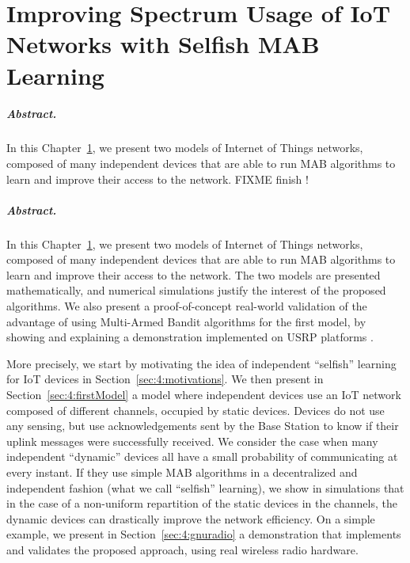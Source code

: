 
\chapter{Improving Spectrum Usage of IoT Networks with Selfish MAB Learning}
\label{chapter:4}

\graphicspath{{2-Chapters/4-Chapter/Images/}}


\paragraph{Abstract.}

In this Chapter~\ref{chapter:4}, we present two models of Internet of Things networks, composed of many independent devices that are able to run MAB algorithms to learn and improve their access to the network.
FIXME finish !

\minitoc

\newpage

\paragraph{Abstract.}

In this Chapter~\ref{chapter:4}, we present two models of Internet of Things networks, composed of many independent devices that are able to run MAB algorithms to learn and improve their access to the network.
The two models are presented mathematically, and numerical simulations justify the interest of the proposed algorithms.
We also present a proof-of-concept real-world validation of the advantage of using Multi-Armed Bandit algorithms for the first model, by showing and explaining a demonstration implemented on USRP platforms \cite{USRPDocumentation}.

More precisely, we start by motivating the idea of independent ``selfish'' learning for IoT devices in Section~\ref{sec:4:motivations}.
We then present in Section~\ref{sec:4:firstModel} a model where independent devices use an IoT network composed of different channels, occupied by static devices.
Devices do not use any sensing, but use acknowledgements sent by the Base Station to know if their uplink messages were successfully received.
We consider the case when many independent ``dynamic'' devices all have a small probability of communicating at every instant. If they use simple MAB algorithms in a decentralized and independent fashion (what we call ``selfish'' learning),
we show in simulations that in the case of a non-uniform repartition of the static devices in the channels, the dynamic devices can drastically improve the network efficiency.
%
On a simple example, we present in Section~\ref{sec:4:gnuradio} a demonstration that implements and validates the proposed approach, using real wireless radio hardware.

